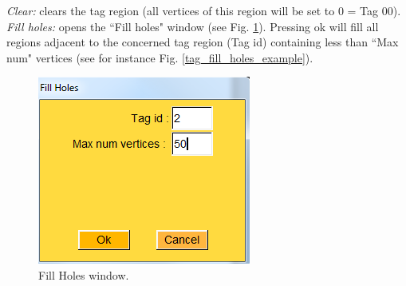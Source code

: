 \textit{Clear:} clears the tag region (all vertices of this region will be set to 0 = Tag 00).
\textit{Fill holes:} opens the ``Fill holes" window (see Fig. \ref{fill_holes_window}). Pressing ok will fill all regions adjacent to the concerned tag region (Tag id) containing less than ``Max num" vertices (see for instance Fig. \ref{tag_fill_holes_example}).
\begin{figure}
  \centering
  \includegraphics[scale=0.5]{images/Tags/Fill Holes.png} 
	\caption{Fill Holes window.}
\label{fill_holes_window}
 \end{figure}

